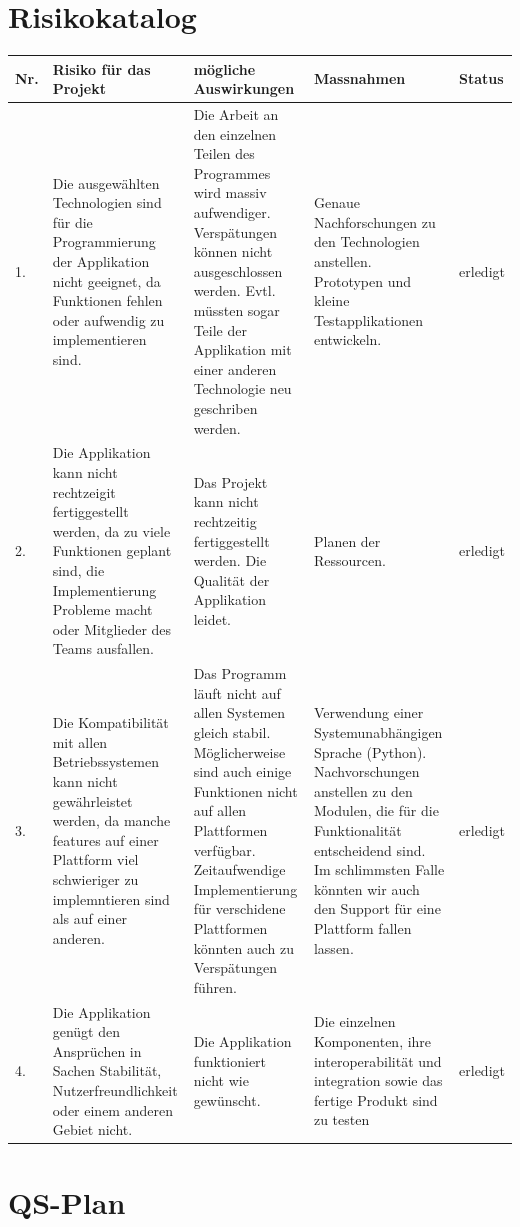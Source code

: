 \documentclass[10pt,paper=a4,final]{scrartcl}
\begin{document}
\section{Risikokatalog}
\begin{tabularx}{\textwidth}{|l|X|X|X|p{1cm}|}
  \hline
  \bf Nr. \cellcolor{blue!20!}& \bf Risiko f\"ur das Projekt \cellcolor{blue!20!}& \bf m\"ogliche Auswirkungen \cellcolor{blue!20!}& \bf Massnahmen \cellcolor{blue!20!}& \bf Status \cellcolor{blue!20!}\\ \hline
  1. & Die ausgew\"ahlten Technologien sind f\"ur die Programmierung der Applikation nicht geeignet, da Funktionen fehlen oder aufwendig zu implementieren sind.& Die Arbeit an den einzelnen Teilen des Programmes wird massiv aufwendiger. Versp\"atungen k\"onnen nicht ausgeschlossen werden. Evtl. m\"ussten sogar Teile der Applikation mit einer anderen Technologie neu geschriben werden.& Genaue Nachforschungen zu den Technologien anstellen. Prototypen und kleine Testapplikationen entwickeln.& erledigt\\ \hline
  2. & Die Applikation kann nicht rechtzeigit fertiggestellt werden, da zu viele Funktionen geplant sind, die Implementierung Probleme macht oder Mitglieder des Teams ausfallen.& Das Projekt kann nicht rechtzeitig fertiggestellt werden. Die Qualit\"at der Applikation leidet.& Planen der Ressourcen.& erledigt\\ \hline
  3. & Die Kompatibilit\"at mit allen Betriebssystemen kann nicht gew\"ahrleistet werden, da manche features auf einer Plattform viel schwieriger zu implemntieren sind als auf einer anderen.& Das Programm l\"auft nicht auf allen Systemen gleich stabil. M\"oglicherweise sind auch einige Funktionen nicht auf allen Plattformen verf\"ugbar. Zeitaufwendige Implementierung f\"ur verschidene Plattformen k\"onnten auch zu Versp\"atungen f\"uhren.& Verwendung einer Systemunabh\"angigen Sprache (Python). Nachvorschungen anstellen zu den Modulen, die f\"ur die Funktionalit\"at entscheidend sind. Im schlimmsten Falle k\"onnten wir auch den Support f\"ur eine Plattform fallen lassen.& erledigt\\ \hline
  4. & Die Applikation gen\"ugt den Anspr\"uchen in Sachen Stabilit\"at, Nutzerfreundlichkeit oder einem anderen Gebiet nicht.& Die Applikation funktioniert nicht wie gew\"unscht.& Die einzelnen Komponenten, ihre interoperabilit\"at und integration sowie das fertige Produkt sind zu testen& erledigt\\ \hline
\end{tabularx}
\section{QS-Plan}
\end{document}
